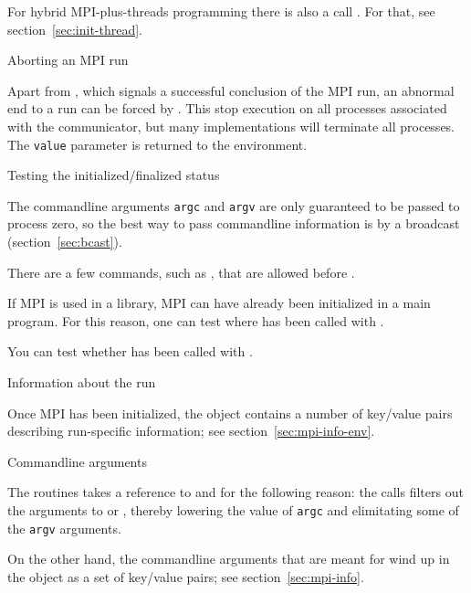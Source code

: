 
\begin{remark}
  For hybrid MPI-plus-threads programming there is also a call
  . For that, see
  section~\ref{sec:init-thread}.
\end{remark}

 {Aborting an MPI run}

Apart from , which signals a successful
conclusion of the MPI run, an abnormal end to a run can be forced by
.
%
This stop execution on all processes associated with the communicator,
but many implementations will terminate all processes. The \lstinline{value} parameter
is returned to the environment.


 {Testing the initialized/finalized status}

The commandline arguments \lstinline{argc} and \lstinline{argv} are only guaranteed to
be passed to process zero, so the best way to pass commandline information
is by a broadcast (section~\ref{sec:bcast}).

There are a few commands, such as
, that are allowed before
.

If MPI is used in a library, MPI can have already been initialized in a main program.
For this reason, one can test where  has been called with
%
.

You can test whether  has been called with
%
.

 {Information about the run}

Once MPI has been initialized, the  object
contains a number of key/value pairs describing run-specific
information; see section~\ref{sec:mpi-info-env}.

 {Commandline arguments}

The  routines takes a reference to 
and  for the following reason: the  calls
filters out the arguments to  or ,
thereby lowering the value of \lstinline{argc} and elimitating some of the \lstinline{argv}
arguments.

On the other hand, the commandline arguments that are meant for 
wind up in the  object as a set of
key/value pairs; see section~\ref{sec:mpi-info}.


